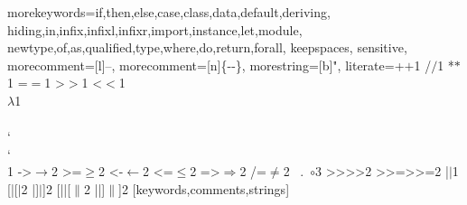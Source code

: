 \usepackage{listings}
\usepackage{lstlinebgrd}
\usepackage{etoolbox}
\usepackage{letltxmacro}


%
  {morekeywords={if,then,else,case,class,data,default,deriving,%
      hiding,in,infix,infixl,infixr,import,instance,let,module,%
      newtype,of,as,qualified,type,where,do,return,forall},%
   keepspaces,%
   sensitive,%
   morecomment=[l]--,%
   morecomment=[n]{\{-}{-\}},%
   morestring=[b]",%
   literate={+}{{$+$}}1 {/}{{$/$}}1 {*}{{$*$}}1 {=}{{$=$}}1
            {>}{{$>$}}1 {<}{{$<$}}1 {\\}{{$\lambda$}}1
            {\\\\}{{\char`\\\char`\\}}1
            {->}{{$\rightarrow$}}2 {>=}{{$\geq$}}2 {<-}{{$\leftarrow$}}2
            {<=}{{$\leq$}}2 {=>}{{$\Rightarrow$}}2 
            {/=}{{$\ne$}}2
            {\ .\ }{{$\circ$}}3
            {>>}{{>>}}2 {>>=}{{>>=}}2
            {|}{{$\mid$}}1
            {[|}{{[$|$}}2
            {|]}{{$|$]}}2
            {[||}{{[$\|$}}2
            {||]}{{$\|$]}}2
  }[keywords,comments,strings]%
\lstset{language=Haskell}


